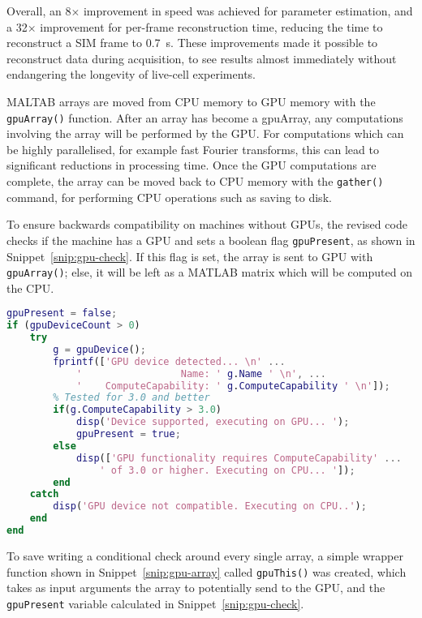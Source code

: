 Overall, an 8$\times$ improvement in speed was achieved for parameter estimation, and a 32$\times$ improvement for per-frame reconstruction time, reducing the time to reconstruct a SIM frame to \SI{0.7}{\second}. 
These improvements made it possible to reconstruct data during acquisition, to see results almost immediately without endangering the longevity of live-cell experiments. 

MALTAB arrays are moved from CPU memory to GPU memory with the \texttt{gpuArray()} function. 
After an array has become a gpuArray, any computations involving the array will be performed by the GPU. 
For computations which can be highly parallelised, for example fast Fourier transforms, this can lead to significant reductions in processing time. 
Once the GPU computations are complete, the array can be moved back to CPU memory with the \texttt{gather()} command, for performing CPU operations such as saving to disk. 

To ensure backwards compatibility on machines without GPUs, the revised code checks if the machine has a GPU and sets a boolean flag \texttt{gpuPresent}, as shown in Snippet~\ref{snip:gpu-check}. 
If this flag is set, the array is sent to GPU with \texttt{gpuArray()}; else, it will be left as a MATLAB matrix which will be computed on the CPU. 

\begin{lstfloat}
\begin{lstlisting}[language=matlab,caption={A check must be performed at the start of the main program to detect if a suitable graphics card is installed for GPU computation},label={snip:gpu-check},frame=single]
gpuPresent = false; 
if (gpuDeviceCount > 0) 
    try
        g = gpuDevice();
        fprintf(['GPU device detected... \n' ...
            '                 Name: ' g.Name ' \n', ...
            '    ComputeCapability: ' g.ComputeCapability ' \n']);
        % Tested for 3.0 and better
        if(g.ComputeCapability > 3.0)
            disp('Device supported, executing on GPU... '); 
            gpuPresent = true; 
        else
            disp(['GPU functionality requires ComputeCapability' ...
                ' of 3.0 or higher. Executing on CPU... ']); 
        end
    catch
        disp('GPU device not compatible. Executing on CPU..');
    end
end
\end{lstlisting}
\end{lstfloat}


To save writing a conditional check around every single array, a simple wrapper function shown in Snippet~\ref{snip:gpu-array} called \texttt{gpuThis()} was created, which takes as input arguments the array to potentially send to the GPU, and the \texttt{gpuPresent} variable calculated in Snippet~\ref{snip:gpu-check}.

